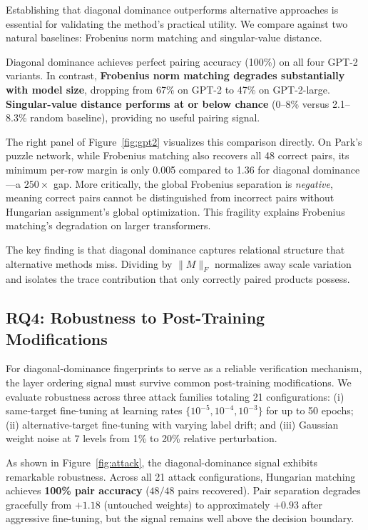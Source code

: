 \documentclass[wcp]{jmlr}
\begin{document}
Establishing that diagonal dominance outperforms alternative approaches is essential for validating the method's practical utility. We compare against two natural baselines: Frobenius norm matching and singular-value distance.

Diagonal dominance achieves perfect pairing accuracy (100\%) on all four GPT-2 variants. In contrast, \textbf{Frobenius norm matching degrades substantially with model size}, dropping from 67\% on GPT-2 to 47\% on GPT-2-large. \textbf{Singular-value distance performs at or below chance} (0--8\% versus 2.1--8.3\% random baseline), providing no useful pairing signal.

The right panel of Figure~\ref{fig:gpt2} visualizes this comparison directly. On Park's puzzle network, while Frobenius matching also recovers all 48 correct pairs, its minimum per-row margin is only 0.005 compared to 1.36 for diagonal dominance---a $250\times$ gap. More critically, the global Frobenius separation is \emph{negative}, meaning correct pairs cannot be distinguished from incorrect pairs without Hungarian assignment's global optimization. This fragility explains Frobenius matching's degradation on larger transformers.

The key finding is that diagonal dominance captures relational structure that alternative methods miss. Dividing by $\|M\|_F$ normalizes away scale variation and isolates the trace contribution that only correctly paired products possess.

\subsection{RQ4: Robustness to Post-Training Modifications}

For diagonal-dominance fingerprints to serve as a reliable verification mechanism, the layer ordering signal must survive common post-training modifications. We evaluate robustness across three attack families totaling 21 configurations: (i) same-target fine-tuning at learning rates $\{10^{-5}, 10^{-4}, 10^{-3}\}$ for up to 50 epochs; (ii) alternative-target fine-tuning with varying label drift; and (iii) Gaussian weight noise at 7 levels from 1\% to 20\% relative perturbation.

As shown in Figure~\ref{fig:attack}, the diagonal-dominance signal exhibits remarkable robustness. Across all 21 attack configurations, Hungarian matching achieves \textbf{100\% pair accuracy} ($48/48$ pairs recovered). Pair separation degrades gracefully from $+1.18$ (untouched weights) to approximately $+0.93$ after aggressive fine-tuning, but the signal remains well above the decision boundary.
\end{document}
